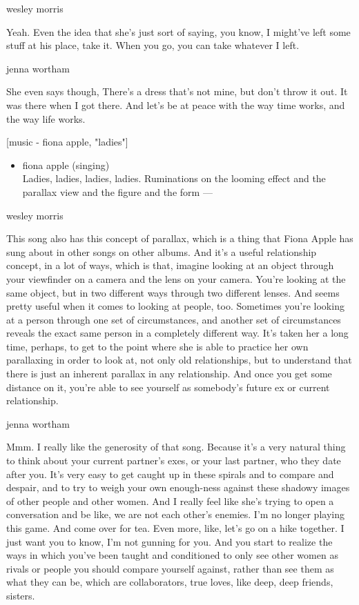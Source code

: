 wesley morris

Yeah. Even the idea that she's just sort of saying, you know, I might've
left some stuff at his place, take it. When you go, you can take
whatever I left.

jenna wortham

She even says though, There's a dress that's not mine, but don't throw
it out. It was there when I got there. And let's be at peace with the
way time works, and the way life works.

{[}music - fiona apple, "ladies"{]}

\begin{itemize}
\tightlist
\item
  fiona apple (singing)\\
  Ladies, ladies, ladies, ladies. Ruminations on the looming effect and
  the parallax view and the figure and the form ---
\end{itemize}

wesley morris

This song also has this concept of parallax, which is a thing that Fiona
Apple has sung about in other songs on other albums. And it's a useful
relationship concept, in a lot of ways, which is that, imagine looking
at an object through your viewfinder on a camera and the lens on your
camera. You're looking at the same object, but in two different ways
through two different lenses. And seems pretty useful when it comes to
looking at people, too. Sometimes you're looking at a person through one
set of circumstances, and another set of circumstances reveals the exact
same person in a completely different way. It's taken her a long time,
perhaps, to get to the point where she is able to practice her own
parallaxing in order to look at, not only old relationships, but to
understand that there is just an inherent parallax in any relationship.
And once you get some distance on it, you're able to see yourself as
somebody's future ex or current relationship.

jenna wortham

Mmm. I really like the generosity of that song. Because it's a very
natural thing to think about your current partner's exes, or your last
partner, who they date after you. It's very easy to get caught up in
these spirals and to compare and despair, and to try to weigh your own
enough-ness against these shadowy images of other people and other
women. And I really feel like she's trying to open a conversation and be
like, we are not each other's enemies. I'm no longer playing this game.
And come over for tea. Even more, like, let's go on a hike together. I
just want you to know, I'm not gunning for you. And you start to realize
the ways in which you've been taught and conditioned to only see other
women as rivals or people you should compare yourself against, rather
than see them as what they can be, which are collaborators, true loves,
like deep, deep friends, sisters.

